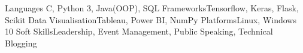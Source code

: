 \begin{cvskills}
	\cvskill
   	{Languages}	{C, Python 3, Java(OOP), SQL}
    \cvskill
     {Frameworks}{Tensorflow, Keras, Flask, Scikit}
     \cvskill
     {Data Visualisation}{Tableau, Power BI, NumPy}
      \cvskill
     {Platforms}{Linux, Windows 10}
       \cvskill
     {Soft Skills}{Leadership, Event Management, Public Speaking, Technical Blogging}
    \vspace{-8mm}
\end{cvskills}
